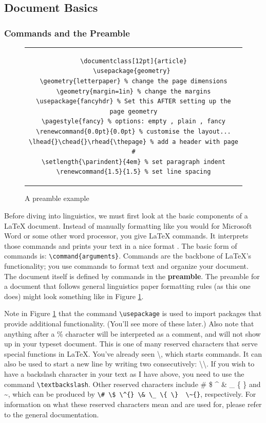 \documentclass[12pt]{article}
\renewcommand{\headrulewidth}{0.0pt} %
\renewcommand{\baselinestretch}{1.5} %
\begin{document}
\subsection{Document Basics}

\subsubsection{Commands and the Preamble}

\begin{figure}[h]
\centering
\caption{A preamble example}
\label{fig:preamble}
\begin{tabular}{c}
\begin{lstlisting}
\documentclass[12pt]{article}
\usepackage{geometry} 
\geometry{letterpaper} % change the page dimensions
\geometry{margin=1in} % change the margins
\usepackage{fancyhdr} % Set this AFTER setting up the page geometry
\pagestyle{fancy} % options: empty , plain , fancy
\renewcommand{\headrulewidth}{0.0pt} % customise the layout...
\lhead{}\chead{}\rhead{\thepage} % add a header with page #
\setlength{\parindent}{4em} % set paragraph indent
\renewcommand{\baselinestretch}{1.5} % set line spacing
\end{lstlisting}
\end{tabular}
\end{figure}

Before diving into linguistics, we must first look at the basic components of a {\LaTeX} document. Instead of manually formatting like you would for Microsoft Word or some other word processor, you give {\LaTeX} commands. It interprets those commands and prints your text in a nice format . The basic form of commands is: \verb!\command{arguments}!. Commands are the backbone of {\LaTeX}'s functionality; you use commands to format text and organize your document. The document itself is defined by commands in the \textbf{preamble}. The preamble for a document that follows general linguistics paper formatting rules (as this one does) might look something like in Figure \ref{fig:preamble}.

Note in Figure \ref{fig:preamble} that the command \verb!\usepackage! is used to import packages that provide additional functionality. (You'll see more of these later.) Also note that anything after a \% character will be interpreted as a comment, and will not show up in your typeset document. This is one of many reserved characters that serve special functions in {\LaTeX}. You've already seen \textbackslash, which starts commands. It can also be used to start a new line by writing two consecutively: \textbackslash \textbackslash. If you wish to have a backslash character in your text as I have above, you need to use the command \verb!\textbackslash!. Other reserved characters include \# \$ \^{} \& \_ \{  \} and \~{}, which can be produced by \verb!\# \$ \^{} \& \_ \{ \}  \~{}!, respectively. For information on what these reserved characters mean and are used for, please refer to the general documentation.
\end{document}
